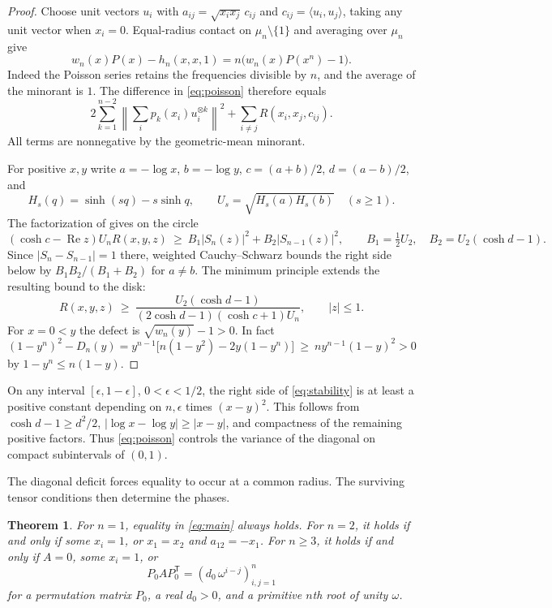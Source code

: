 \documentclass[10pt,twoside,reqno]{amsart}
\newtheorem{theorem}{Theorem}
\numberwithin{equation}{section}
\newcommand{\re}{\operatorname{Re}}
\begin{document}
\begin{proof}
Choose unit vectors \(u_i\) with \(a_{ij}=\sqrt{x_ix_j}\,c_{ij}\) and
\(c_{ij}=\langle u_i,u_j\rangle\), taking any unit vector when \(x_i=0\).
Equal-radius contact on \(\mu_n\setminus\{1\}\) and averaging over \(\mu_n\)
give
\[
 w_n(x)P(x)-h_n(x,x,1)=n\bigl(w_n(x)P(x^n)-1\bigr).
\]
Indeed the Poisson series retains the frequencies divisible by \(n\), and
the average of the minorant is \(1\). The difference in \eqref{eq:poisson}
therefore equals
\begin{equation}\label{eq:sumgap}
 2\sum_{k=1}^{n-2}\left\|\sum_i p_k(x_i)u_i^{\otimes k}\right\|^2
        +\sum_{i\ne j}R(x_i,x_j,c_{ij}).
\end{equation}
All terms are nonnegative by the geometric-mean minorant.

For positive \(x,y\) write \(a=-\log x\), \(b=-\log y\),
\(c=(a+b)/2\), \(d=(a-b)/2\), and
\[
 H_s(q)=\sinh(sq)-s\sinh q,\qquad U_s=\sqrt{H_s(a)H_s(b)}
 \quad(s\ge1).
\]
The factorization of \cite{main} gives on the circle
\[
 (\cosh c-\re z)U_n R(x,y,z)
 \ \ge\ B_1|S_n(z)|^2+B_2|S_{n-1}(z)|^2,\qquad
 B_1=\tfrac12U_2,\quad B_2=U_2(\cosh d-1).
\]
Since \(|S_n-S_{n-1}|=1\) there, weighted Cauchy--Schwarz bounds
the right side below by \(B_1B_2/(B_1+B_2)\) for \(a\ne b\).
The minimum principle extends the resulting bound to the disk:
\begin{equation}\label{eq:stability}
 R(x,y,z)\ \ge\
 \frac{U_2(\cosh d-1)}{(2\cosh d-1)(\cosh c+1)U_n},
 \qquad |z|\le1.
\end{equation}
For \(x=0<y\) the defect is \(\sqrt{w_n(y)}-1>0\). In fact
\[
 (1-y^n)^2-D_n(y)
 =y^{n-1}\bigl[n(1-y^2)-2y(1-y^n)\bigr]
 \ \ge\ n y^{n-1}(1-y)^2>0
\]
by \(1-y^n\le n(1-y)\).
\end{proof}

On any interval \([\epsilon,1-\epsilon]\), \(0<\epsilon<1/2\), the
right side of \eqref{eq:stability} is at least a positive constant depending
on \(n,\epsilon\) times \((x-y)^2\). This follows from
\(\cosh d-1\ge d^2/2\), \(|\log x-\log y|\ge|x-y|\), and compactness
of the remaining positive factors. Thus \eqref{eq:poisson} controls the
variance of the diagonal on compact subintervals of \((0,1)\).

\medskip
\noindent
The diagonal deficit forces equality to occur at a common radius.
The surviving tensor conditions then determine the phases.

\begin{theorem}\label{thm:equality}
For \(n=1\), equality in \eqref{eq:main} always holds. For \(n=2\), it holds
if and only if some \(x_i=1\), or \(x_1=x_2\) and \(a_{12}=-x_1\).
For \(n\ge3\), it holds if and only if \(A=0\), some \(x_i=1\), or
\[
 P_0 A P_0^{\mathsf T}=(d_0\,\omega^{i-j})_{i,j=1}^n
\]
for a permutation matrix \(P_0\), a real \(d_0>0\), and a primitive
\(n\)th root of unity \(\omega\).
\end{theorem}
\end{document}
